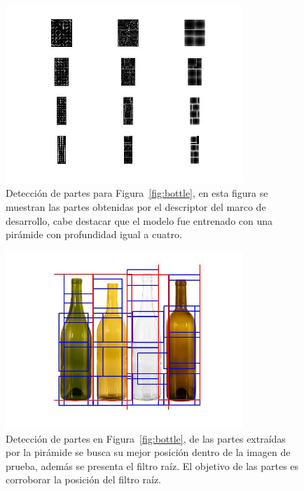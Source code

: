 \begin{figure}[tb]
\centering
 \includegraphics[width=0.8\textwidth]{Figuras/results/bottle-parts.jpg}
 \caption[Detección de partes para un objeto]{Detección de partes para Figura~\ref{fig:bottle}, en esta figura se muestran las partes obtenidas por el descriptor del marco de desarrollo, cabe destacar que el modelo fue entrenado con una pirámide con profundidad igual a cuatro.}
 \label{fig:bottle-parts}
\end{figure}

\begin{figure}[tb]
\centering
 \includegraphics[width=0.8\textwidth]{Figuras/results/bottle-parts-final.jpg}
 \caption[Detección de partes en imagen de un objeto]{Detección de partes en Figura~\ref{fig:bottle}, de las partes extraídas por la pirámide se busca su mejor posición dentro de la imagen de prueba, además se presenta el filtro raíz. El objetivo de las partes es corroborar la posición del filtro raíz.}
 \label{fig:bottle-parts-final}
\end{figure}

